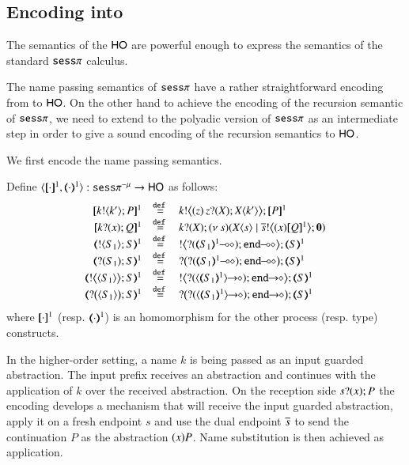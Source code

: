 \subsection{Encoding \sespnr  into \HO}

The semantics of the $\mathsf{HO}$ are powerful enough to
express the semantics of the standard $\mathtt{sess}\pi$ calculus.

The name passing semantics of $\mathtt{sess}\pi$ have a rather straightforward
encoding from to $\mathsf{HO}$.
On the other hand to achieve the encoding of the recursion semantic
of $\mathtt{sess}\pi$, we need to extend
to the polyadic version of $\mathtt{sess}\pi$ as an intermediate step in order
to give a sound encoding of the recursion semantics to $\mathsf{HO}$.

We first encode the name passing semantics.

\begin{definition}\rm
	Define $\encod{\cdot}{\cdot}{1}: \sespnr \to \HO$  as follows:
	\[
	\begin{array}{rcl}
		\pmap{\bout{k}{k'} P}{1}		&\defeq&	\bbout{k}{ \abs{z}{\,\binp{z}{X} \appl{X}{k'}} } \pmap{P}{1} \\
		\pmap{\binp{k}{x} Q}{1}			&\defeq&	\binp{k}{X} \newsp{s}{\appl{X}{s} \Par \bbout{\dual{s}}{\abs{x} \pmap{Q}{1}} \inact} \\
		\tmap{\btout{S_1} {S} }{1}		&\defeq&	\bbtout{\lhot{\btinp{\lhot{\tmap{S_1}{1}}}\tinact}} \tmap{S}{1}  \\
		\tmap{\btinp{S_1} S }{1}		&\defeq&	\bbtinp{\lhot{\btinp{\lhot{\tmap{S_1}{1}}}\tinact}} \tmap{S}{1} \\
		\tmap{\bbtout{\chtype{S_1}}{S}}{1}	&\defeq&	\bbtout{\shot{\btinp{\shot{\chtype{\tmap{S_1}{1}}}}\tinact}} \tmap{S}{1}  \\
		\tmap{\bbtinp{\chtype{S_1}}{S}}{1}	&\defeq&	\bbtinp{\shot{\btinp{\shot{\chtype{\tmap{S_1}{1}}}}\tinact}} \tmap{S}{1} 
	\end{array}
	\]
	where $[\!\![\cdot]\!\!]^1$ (resp. $(\!\!\langle\cdot\rangle\!\!)^1$) is an 
	homomorphism for the other process (resp. type) constructs.
\end{definition}

In the higher-order setting, a name $k$ is being passed as an input
guarded abstraction. The input prefix receives an abstraction and
continues with the application of $k$ over the received abstraction.
On the reception side $s ? (x) ; P$ 
the encoding develops a mechanism that will receive
the input guarded abstraction, apply it on a fresh endpoint $s$ and use
the dual endpoint $\overline{s}$ to send the continuation $P$ as the abstraction
$(x)P$. Name substitution is then achieved as application.

